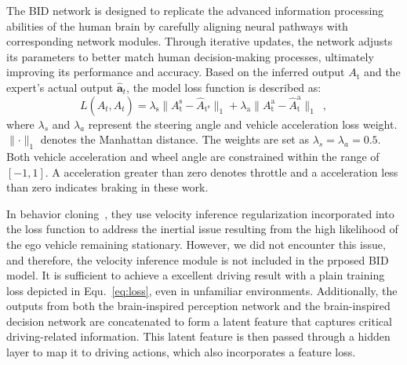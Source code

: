 \hspace{1pc}The BID network is designed to replicate the advanced information processing abilities of the human brain by carefully aligning neural pathways with corresponding network modules. 
Through iterative updates, the network adjusts its parameters to better match human decision-making processes, ultimately improving its performance and accuracy.
%
Based on the inferred output $A_\text{t}$ and the expert's actual output $\hat{\mathbf{a}}_{t}$, the model loss function is described as:
\begin{equation}\label{eq:loss}
	L(A_t, \hat{A}_t) 
	= \lambda_{\text{s}} \lVert A_{\text{t}}^\text{s}-\hat{A}_{\text{t}^\text{s}} \rVert_{1}
	+ \lambda_{\text{a}}\lVert A_{\text{t}}^\text{a}-\hat{A}_{\text{t}}^\text{a}\rVert_{1} \enspace ,
\end{equation}
where $\lambda_{s}$ and $\lambda_a$ represent the steering angle and vehicle acceleration loss weight.
$\lVert\cdot\rVert_{1}$ denotes the Manhattan distance.
The weights are set as $\lambda_{s} = \lambda_{a} = 0.5$. 
Both vehicle acceleration and wheel angle are constrained within the range of $[-1, 1]$.
A acceleration greater than zero denotes throttle and a acceleration less than zero indicates braking in these work.


In behavior cloning~\cite{Codevilla:2019}, they use velocity inference regularization incorporated into the loss function to address the inertial issue resulting from the high likelihood of the ego vehicle remaining stationary.
However, we did not encounter this issue, and therefore, the velocity inference module is not included in the prposed BID model.
It is sufficient to achieve a excellent driving result with a plain training loss depicted in Equ.~\ref{eq:loss}, even in unfamiliar environments.
%
Additionally, the outputs from both the brain-inspired perception network and the brain-inspired decision network are concatenated to form a latent feature that captures critical driving-related information. 
This latent feature is then passed through a hidden layer to map it to driving actions, which also incorporates a feature loss.


%


